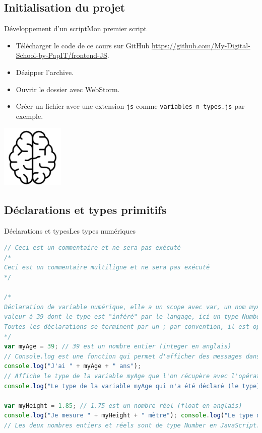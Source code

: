 \documentclass{beamer}
\begin{document}
    \subsection{Initialisation du projet}\label{subsec:projectinit}

    \begin{frame}{Développement d'un script}{Mon premier script}
        \begin{itemize}
            \item Télécharger le code de ce cours sur GitHub
            \url{https://github.com/My-Digital-School-by-PapIT/frontend-JS}.
            \item Dézipper l'archive.
            \item Ouvrir le dossier avec WebStorm.
            \item Créer un fichier avec une extension
            \lstinline{js} comme \lstinline{variables-n-types.js} par exemple.
        \end{itemize}
        \bigbreak
        \centering
        \includegraphics[width=3cm]{image/intelligence}
    \end{frame}

    \subsection{Déclarations et types primitifs}\label{subsec:declare-n-types}

    \begin{frame}[fragile]{Déclarations et types}{Les types numériques}
        \begin{lstlisting}[language=JavaScript,title={\scriptsize{Script JavaScript}},basicstyle=\tiny\ttfamily]
// Ceci est un commentaire et ne sera pas exécuté
/*
Ceci est un commentaire multiligne et ne sera pas exécuté
*/

/*
Déclaration de variable numérique, elle a un scope avec var, un nom myAge et une
valeur à 39 dont le type est "inféré" par le langage, ici un type Number.
Toutes les déclarations se terminent par un ; par convention, il est optionnel.
*/
var myAge = 39; // 39 est un nombre entier (integer en anglais)
// Console.log est une fonction qui permet d'afficher des messages dans la console
console.log("J'ai " + myAge + " ans");
// Affiche le type de la variable myAge que l'on récupère avec l'opérateur typeof
console.log("Le type de la variable myAge qui n'a été déclaré (le type) est " + typeof myAge);

var myHeight = 1.85; // 1.75 est un nombre réel (float en anglais)
console.log("Je mesure " + myHeight + " mètre"); console.log("Le type de la variable myHeight qui n'a été déclaré (le type) est " + typeof myHeight);
// Les deux nombres entiers et réels sont de type Number en JavaScript.
        \end{lstlisting}
    \end{frame}
\end{document}
